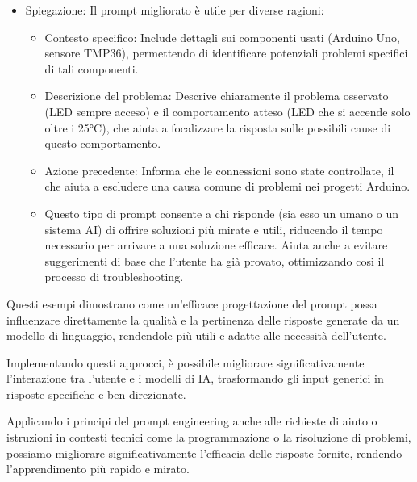 \begin{enumerate}
\begin{itemize}
                    \item Spiegazione: Il prompt migliorato è utile per diverse ragioni:
                    \begin{itemize}
                        \item Contesto specifico: Include dettagli sui componenti usati (Arduino Uno, sensore TMP36), permettendo di identificare potenziali problemi specifici di tali componenti.
            
                        \item Descrizione del problema: Descrive chiaramente il problema osservato (LED sempre acceso) e il comportamento atteso (LED che si accende solo oltre i 25°C), che aiuta a focalizzare la risposta sulle possibili cause di questo comportamento.
                        
                        \item Azione precedente: Informa che le connessioni sono state controllate, il che aiuta a escludere una causa comune di problemi nei progetti Arduino.

                        \item Questo tipo di prompt consente a chi risponde (sia esso un umano o un sistema AI) di offrire soluzioni più mirate e utili, riducendo il tempo necessario per arrivare a una soluzione efficace. Aiuta anche a evitare suggerimenti di base che l'utente ha già provato, ottimizzando così il processo di troubleshooting.
                    \end{itemize}
                \end{itemize}
            \end{enumerate}
            
            
            Questi esempi dimostrano come un'efficace progettazione del prompt possa influenzare direttamente la qualità e la pertinenza delle risposte generate da un modello di linguaggio, rendendole più utili e adatte alle necessità dell'utente.
            
            Implementando questi approcci, è possibile migliorare significativamente l'interazione tra l'utente e i modelli di IA, trasformando gli input generici in risposte specifiche e ben direzionate.
            
            Applicando i principi del prompt engineering anche alle richieste di aiuto o istruzioni in contesti tecnici come la programmazione o la risoluzione di problemi, possiamo migliorare significativamente l'efficacia delle risposte fornite, rendendo l'apprendimento più rapido e mirato.
            

